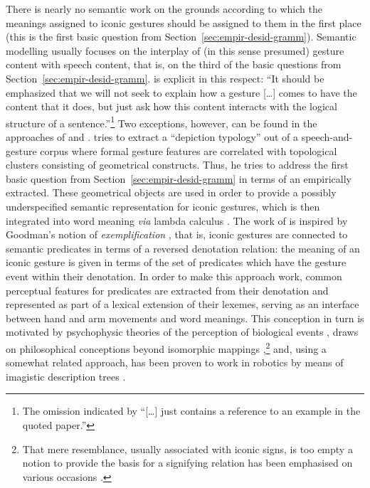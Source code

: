 \documentclass[output=paper]{langsci/langscibook}
\begin{document}
 
There is nearly no semantic work on the grounds according to which the meanings assigned to iconic gestures should be assigned to them in the first place (this is the first basic question from Section~\ref{sec:empir-desid-gramm}).
%
Semantic modelling usually focuses on the interplay of (in this sense presumed) gesture content with speech content, that is, on the third of the basic questions from Section~\ref{sec:empir-desid-gramm}.
%
\citet[]{Schlenker:2018} is explicit in this respect: \enquote{It should be emphasized that we will not seek to explain how a gesture [\ldots] comes to have the content that it does, but just ask how this content interacts with the logical structure of a sentence.}\footnote{The omission indicated by \enquote{[\ldots] just contains a reference to an example in the quoted paper.}}
%
Two exceptions, however, can be found in the approaches of \citet{Rieser:2010} and \citet{Luecking:2013:a,Luecking:2016}.
%
\citet{Rieser:2010} tries to extract a \enquote{depiction typology} out of a speech-and-gesture corpus where formal gesture features are correlated with topological clusters consisting of geometrical constructs. 
%
Thus, he tries to address the first basic question from Section~\ref{sec:empir-desid-gramm} in terms of an empirically extracted.
%
These geometrical objects are used in order to provide a possibly underspecified semantic representation for iconic gestures, which is then integrated into word meaning \textit{via} lambda calculus \citep{Hahn:Rieser:2010,Rieser:2011}.
%
The work of \citet{Luecking:2013:a,Luecking:2016} is inspired by Goodman's notion of \emph{exemplification} \citep{Goodman:1976}, that is, iconic gestures are connected to semantic predicates in terms of a reversed denotation relation: the meaning of an iconic gesture is given in terms of the set of predicates which have the gesture event within their denotation.
%
In order to make this approach work, common perceptual features for predicates are extracted from their denotation and represented as part of a lexical extension of their lexemes, serving as an interface between hand and arm movements and word meanings. 
%
This conception in turn is motivated by psychophysic theories of the perception of biological events \citep{Johansson:1973}, draws on philosophical  conceptions beyond isomorphic mappings \citep{Peacocke:1987},\footnote{\label{fn:resemblance}That mere resemblance, usually associated with iconic signs, is too empty a notion to provide the basis for a signifying relation has been emphasised on various occasions \citep{Burks:1949,Bierman:1962,Eco:1976,Goodman:1976,Sonesson:1998}.} and, using a somewhat related approach, has been proven to work in robotics by means of imagistic description trees \citep{Sowa:2006:a}.
\end{document}

